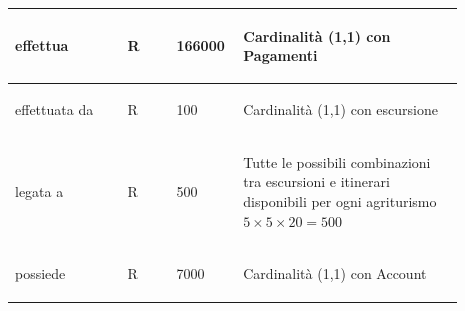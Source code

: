 \documentclass[12pt,a4paper]{article}
\begin{document}
\begin{center}
\begin{longtable}{|p{0.23\linewidth}|p{0.1\linewidth}|p{0.11\linewidth}|p{0.45\linewidth}|}
\hline
effettua
 & 
\begin{center}\vspace{-25pt}R\end{center}
 & 
\begin{center}\vspace{-25pt}166000\end{center}
 & 
\begin{flushleft}\vspace{-25pt}Cardinalità (1,1) con Pagamenti\end{flushleft}
\\

\hline
effettuata da
 & 
\begin{center}\vspace{-25pt}R\end{center}
 & 
\begin{center}\vspace{-25pt}100\end{center}
 & 
\begin{flushleft}\vspace{-25pt}Cardinalità (1,1) con escursione\end{flushleft}
\\

\hline
legata a
 & 
\begin{center}\vspace{-25pt}R\end{center}
 & 
\begin{center}\vspace{-25pt}500\end{center}
 & 
\begin{flushleft}\vspace{-25pt}Tutte le possibili combinazioni tra escursioni e itinerari disponibili per ogni agriturismo $5\times 5 \times 20= 500$\end{flushleft}
\\

\hline
possiede
 & 
\begin{center}\vspace{-25pt}R\end{center}
 & 
\begin{center}\vspace{-25pt}7000\end{center}
 & 
\begin{flushleft}\vspace{-25pt}Cardinalità (1,1) con Account\end{flushleft}
\\


\end{longtable}
\end{center}
\end{document}
